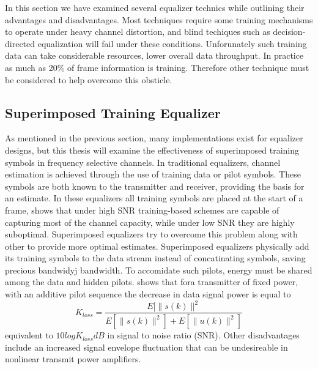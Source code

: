 In this section we have examined several equalizer technics while outlining their advantages and disadvantages.  Most techniques require some training mechanisms to operate under heavy channel distortion, and blind techiques such as decision-directed equalization will fail under these conditions.  Unforunately such training data can take considerable resources, lower overall data throughput.  In practice as much as 20\% of frame information is training.  Therefore other technique must be considered to help overcome this obsticle.\\


\subsection{Superimposed Training Equalizer}

As mentioned in the previous section, many implementations exist for equalizer designs, but this thesis will examine the effectiveness of superimposed training symbols in frequency selective channels.  In traditional equalizers, channel estimation is achieved through the use of training data or pilot symbols.  These symbols are both known to the transmitter and receiver, providing the basis for an estimate.  In these equalizers all training symbols are placed at the start of a frame,\cite{16} shows that under high SNR training-based schemes are capable of capturing most of the channel capacity, while under low SNR they are highly suboptimal.  Superimposed equalizers try to overcome this problem along with other to provide more optimal estimates.  Superimposed equalizers physically add its training symbols to the data stream instead of concatinating symbols, saving precious bandwidyj bandwidth\cite{16}.  To accomidate such pilots, energy must be shared among the data and hidden pilots\cite{15}.  \cite{19} shows that fora transmitter of fixed power, with an additive pilot sequence the decrease in data signal power is equal to \[ K_{loss}=\frac{E[\|s(k)\|^{2}}{E[\|s(k)\|^{2}]+E[\|u(k)\|^{2}]}\] equivalent to \(10logK_{loss}dB\) in signal to noise ratio (SNR).  Other disadvantages include an increased signal envelope fluctuation that can be undesireable in nonlinear transmit power amplifiers\cite{17}.\\  

